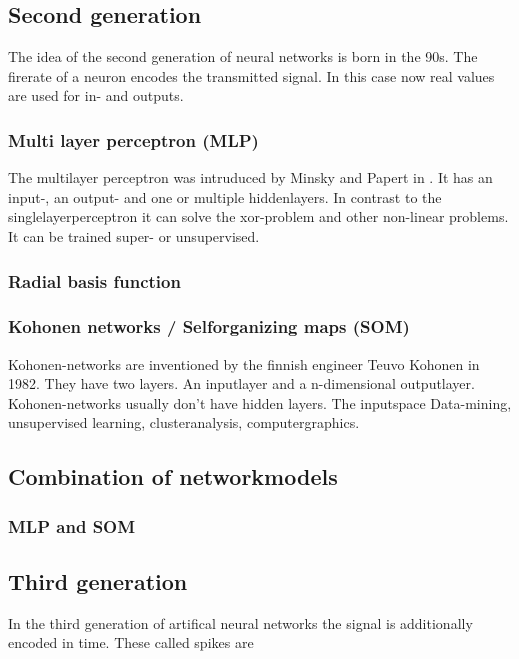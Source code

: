 \documentclass[10pt,a4paper,DIV=11]{scrreprt}
\begin{document}
\subsection{Second generation}
The idea of the second generation of neural networks is born in the 90s. The firerate of a neuron encodes the transmitted signal. In this case now real values are used for in- and outputs.

\subsubsection{Multi layer perceptron (MLP)} \label{sec:mlp}
The multilayer perceptron was intruduced by Minsky and Papert in . It has an input-, an output- and
one or multiple hiddenlayers. In contrast to the singlelayerperceptron it can solve the xor-problem and other non-linear problems. It can be trained super- or unsupervised.


\subsubsection{Radial basis function} %


\subsubsection{Kohonen networks / Selforganizing maps (SOM)}
Kohonen-networks are inventioned by the finnish engineer Teuvo Kohonen in 1982. They have two layers. An inputlayer and a n-dimensional outputlayer.
Kohonen-networks usually don't have hidden layers.
The inputspace 
Data-mining, unsupervised learning, clusteranalysis, computergraphics. 

\subsection{Combination of networkmodels}

\subsubsection{MLP and SOM} %

\subsection{Third generation}
In the third generation of artifical neural networks the signal is additionally encoded in time. These called spikes are
\end{document}
